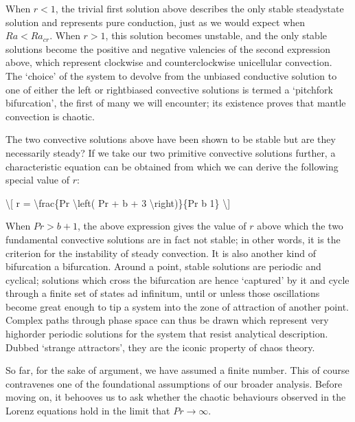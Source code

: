 \documentclass[letterpaper,10pt,english]{jupyterBook}
\begin{document}
\sphinxAtStartPar
When \(r<1\), the trivial first solution above describes the only stable steady\sphinxhyphen{}state solution and represents pure conduction, just as we would expect when \(Ra<Ra_{cr}\). When \(r>1\), this solution becomes unstable, and the only stable solutions become the positive and negative valencies of the second expression above, which represent clockwise and counterclockwise unicellular convection. The ‘choice’ of the system to devolve from the unbiased conductive solution to one of either the left\sphinxhyphen{} or right\sphinxhyphen{}biased convective solutions is termed a ‘pitchfork bifurcation’, the first of many we will encounter; its existence proves that mantle convection is chaotic.

\sphinxAtStartPar
The two convective solutions above have been shown to be stable \sphinxhyphen{} but are they necessarily steady? If we take our two primitive convective solutions further, a characteristic equation can be obtained from which we can derive the following special value of \(r\):

\sphinxAtStartPar
\textbackslash{}{[} r = \textbackslash{}frac\{Pr \textbackslash{}left( Pr + b + 3 \textbackslash{}right)\}\{Pr \sphinxhyphen{} b \sphinxhyphen{} 1\} \textbackslash{}{]}

\sphinxAtStartPar
When \(Pr>b+1\), the above expression gives the value of \(r\) above which the two fundamental convective solutions are in fact not stable; in other words, it is the criterion for the instability of steady convection. It is also another kind of bifurcation \sphinxhyphen{} a  bifurcation. Around a  point, stable solutions are periodic and cyclical; solutions which cross the bifurcation are hence ‘captured’ by it and cycle through a finite set of states ad infinitum, until or unless those oscillations become great enough to tip a system into the zone of attraction of another  point. Complex paths through phase space can thus be drawn which represent very high\sphinxhyphen{}order periodic solutions for the system that resist analytical description. Dubbed ‘strange attractors’, they are the iconic property of chaos theory.

\sphinxAtStartPar
So far, for the sake of argument, we have assumed a finite  number. This of course contravenes one of the foundational assumptions of our broader analysis. Before moving on, it behooves us to ask whether the chaotic behaviours observed in the Lorenz equations hold in the limit that \(Pr\to\infty\).
\end{document}
